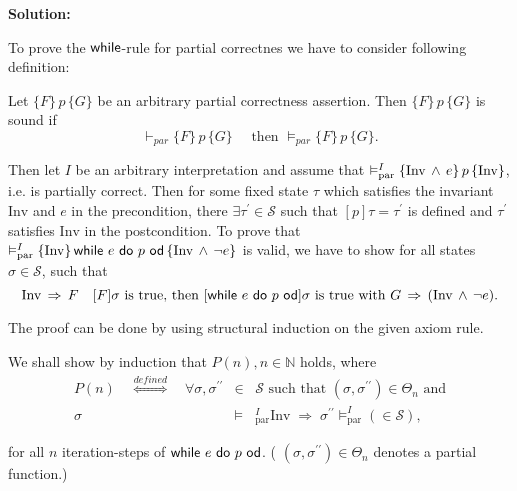 \textbf{Solution:}\newline

To prove the $\mbox{\sffamily while}$-rule for partial correctnes we have to consider
following definition: 
\begin{definition}
	Let $\{F\}\, p\, \{G\}$ be an arbitrary partial correctness assertion. Then $\{F\}\, p\, \{G\}$ is
	sound if
	\begin{equation*}
		\vdash_{par} \{F\}\, p\, \{G\}\quad \text{ then } \vDash_{par} \{F\}\, p\, \{G\}.
	\end{equation*}
\end{definition}

Then let $I$ be an arbitrary interpretation and assume that $\vDash _{%
\mathrm{par}}^{I}\{\mathrm{Inv}\,\wedge \,e\}\,p\,\{\mathrm{Inv}\}$, i.e. is
partially correct. Then for some fixed state $\tau $ which satisfies the
invariant $\mathrm{Inv}$ and $e$ in the precondition, there $\exists \tau
^{\prime }\in \mathcal{S}$ such that $[p]\tau =\tau ^{\prime }$ is defined
and $\tau ^{\prime }$ satisfies $\mathrm{Inv}$ in the postcondition. To
prove that $\vDash _{\mathrm{par}}^{I}\{\mathrm{Inv}\}\,\kw{while}\ e\ %
\kw{do}\ p\ \kw{od}\,\{\mathrm{Inv}\,\wedge \,\lnot e\}$ is valid, we have
to show for all states $\sigma \in \mathcal{S}$, such that%
\begin{equation*}
\mathrm{Inv}\,\Rightarrow \,F\quad \lbrack F]\sigma \text{ is true, then }[%
\kw{while}\ e\ \kw{do}\ p\ \kw{od}]\sigma \text{ is true with }%
G\,\Rightarrow \,(\mathrm{Inv}\,\wedge \,\lnot e).
\end{equation*}

The proof can be done by using structural induction on the given axiom rule.

We shall show by induction that $P(n),n\in \mathbb{N}$ holds, where%
\begin{eqnarray*}
P(n)\quad \overset{defined}{\Longleftrightarrow }\quad \forall \sigma
,\sigma ^{\prime \prime } &\in &\mathcal{S}\text{ such that }(\sigma ,\sigma
^{\prime \prime })\in \Theta _{n}\text{ and} \\
\sigma &\vDash &_{\mathrm{par}}^{I}\mathrm{Inv}\;\Rightarrow \;\sigma
^{\prime \prime }\vDash _{\mathrm{par}}^{I}(\in \mathcal{S}),
\end{eqnarray*}

for all $n$ iteration-steps of $\mbox{\sffamily while}\ e\ \mbox{\sffamily do}\ p\ \mbox{\sffamily od}$. ( $%
(\sigma ,\sigma ^{\prime \prime })\in \Theta _{n}$ denotes a partial
function.)

\bigskip

